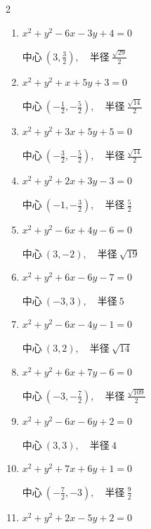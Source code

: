 \begin{multicols}{2}
\begin{enumerate}
  \item $x^{2}+y^{2}-6x-3y+4=0$

        $\displaystyle 中心\: \left(3,\frac{3}{2}\right), \quad 半径 \ \frac{\sqrt{29}}{2}$

  \item $x^{2}+y^{2}+x+5y+3=0$

        $\displaystyle 中心\: \left(-\frac{1}{2},-\frac{5}{2}\right), \quad 半径 \ \frac{\sqrt{14}}{2}$

  \item $x^{2}+y^{2}+3x+5y+5=0$

        $\displaystyle 中心\: \left(-\frac{3}{2},-\frac{5}{2}\right), \quad 半径 \ \frac{\sqrt{14}}{2}$

  \item $x^{2}+y^{2}+2x+3y-3=0$

        $\displaystyle 中心\: \left(-1,-\frac{3}{2}\right), \quad 半径 \ \frac{5}{2}$

  \item $x^{2}+y^{2}-6x+4y-6=0$

        $\displaystyle 中心\: \left(3,-2\right), \quad 半径 \ \sqrt{19}$

  \item $x^{2}+y^{2}+6x-6y-7=0$

        $\displaystyle 中心\: \left(-3,3\right), \quad 半径 \ 5$

  \item $x^{2}+y^{2}-6x-4y-1=0$

        $\displaystyle 中心\: \left(3,2\right), \quad 半径 \ \sqrt{14}$

  \item $x^{2}+y^{2}+6x+7y-6=0$

        $\displaystyle 中心\: \left(-3,-\frac{7}{2}\right), \quad 半径 \ \frac{\sqrt{109}}{2}$

  \item $x^{2}+y^{2}-6x-6y+2=0$

        $\displaystyle 中心\: \left(3,3\right), \quad 半径 \ 4$

\columnbreak %

\resetques

  \item $x^{2}+y^{2}+7x+6y+1=0$

        $\displaystyle 中心\: \left(-\frac{7}{2},-3\right), \quad 半径 \ \frac{9}{2}$

  \item $x^{2}+y^{2}+2x-5y+2=0$


\end{enumerate}
\end{multicols}
